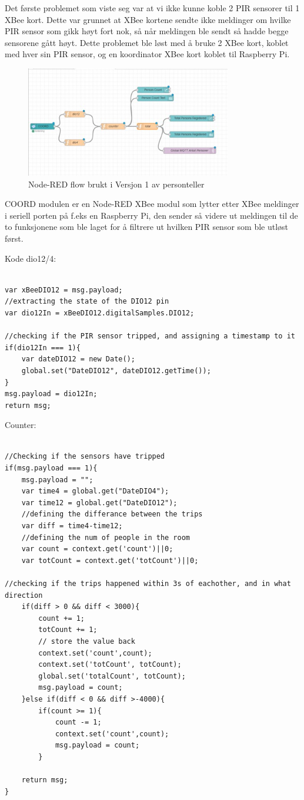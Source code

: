 \documentclass{article}
\begin{document}
Det første problemet som viste seg var at vi ikke kunne koble 2 PIR sensorer til 1 XBee kort. Dette var grunnet at XBee kortene sendte ikke meldinger om hvilke PIR sensor som gikk høyt fort nok, så når meldingen ble sendt så hadde begge sensorene gått høyt. Dette problemet ble løst med å bruke 2 XBee kort, koblet med hver sin PIR sensor, og en koordinator XBee kort koblet til Raspberry Pi. 

\begin{figure} [!ht]
  \centering
      \includegraphics[width=0.8\textwidth]{personteller1}
  \caption{Node-RED flow brukt i Versjon 1 av personteller}
\end{figure}


COORD\cite{coord} modulen er en Node-RED XBee modul som lytter etter XBee meldinger i seriell porten på f.eks en Raspberry Pi, den sender så videre ut meldingen til de to funksjonene som ble laget for å filtrere ut hvilken PIR sensor som ble utløst først.

Kode dio12/4:
\begin{lstlisting}[caption=dio12/4 node funksjon]

var xBeeDIO12 = msg.payload;
//extracting the state of the DIO12 pin
var dio12In = xBeeDIO12.digitalSamples.DIO12;
 
//checking if the PIR sensor tripped, and assigning a timestamp to it
if(dio12In === 1){
	var dateDIO12 = new Date();
	global.set("DateDIO12", dateDIO12.getTime());
}
msg.payload = dio12In;
return msg;
\end{lstlisting}

Counter:

\begin{lstlisting}[caption=Counter node funksjon]

//Checking if the sensors have tripped
if(msg.payload === 1){
	msg.payload = "";
	var time4 = global.get("DateDIO4");
	var time12 = global.get("DateDIO12");
	//defining the differance between the trips
	var diff = time4-time12;
	//defining the num of people in the room
	var count = context.get('count')||0;
	var totCount = context.get('totCount')||0;
	
//checking if the trips happened within 3s of eachother, and in what direction
	if(diff > 0 && diff < 3000){
    	count += 1;
    	totCount += 1;
    	// store the value back
    	context.set('count',count);
    	context.set('totCount', totCount);
    	global.set('totalCount', totCount);
    	msg.payload = count;
	}else if(diff < 0 && diff >-4000){
    	if(count >= 1){
        	count -= 1;
        	context.set('count',count);
        	msg.payload = count;
    	}
    	
	return msg;
}
\end{lstlisting}
\end{document}
